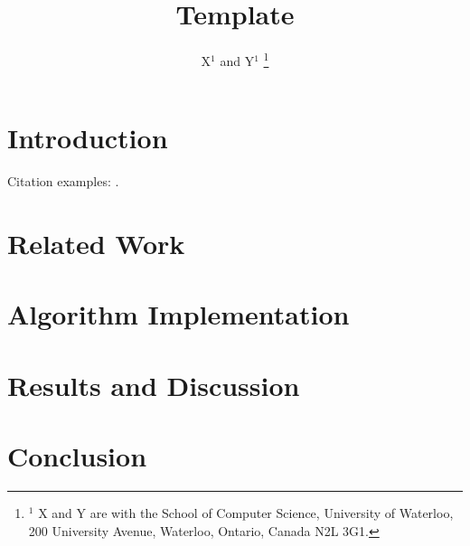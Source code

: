 \documentclass[letterpaper, 12 pt, conference]{ieeeconf}  %
\title{\LARGE \bf Template}
\author{X$^{1}$ and Y$^{1}$ %
\thanks{$^{1}$ X and Y  are with the 
 School of Computer Science, University of Waterloo,
200 University Avenue, Waterloo, Ontario, Canada N2L 3G1.        {\tt\small }}%
}
\begin{document}
\onecolumn
\maketitle
%
\begin{abstract}
\end{abstract}
%

\section{Introduction}
\label{sec:intro}
Citation examples: \cite{An82,An09,Go89,Ra10}.


\section{Related Work}
\label{sec:rw}

\section{Algorithm Implementation}
\label{sec:rw}

\section{Results and Discussion}




\section{Conclusion}





\end{document}

